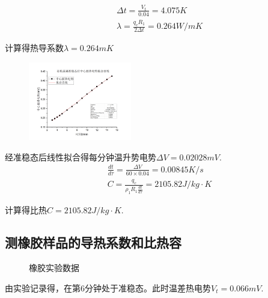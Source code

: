 \documentclass[10pt,a4paper,twocolumn,twoside,UTF8]{ctexart}
\begin{document}
\begin{align*}
	&\varDelta t =\frac{V_t}{0.04}=4.075K\\
    &\lambda=\frac{q_c R_1}{2\varDelta t}=0.264W/mK
\end{align*}

计算得热导系数$\lambda=0.264mK$

\begin{figure}[!h]
	\centering
	\includegraphics[width=0.4\textwidth]{img//6c.png}
	\label{fig:6c}
	\caption{}
\end{figure}
经准稳态后线性拟合得每分钟温升势电势$\varDelta V=0.02028mV$.
\begin{align*}
	&\frac{dt}{d\tau}=\frac{\varDelta V}{60\times 0.04}=0.00845K/s\\
    &C=\frac{q_c}{\rho_1 R_1 \frac{dt}{d\tau}}=2105.82J/kg\cdot K
\end{align*}

计算得比热$C=2105.82J/kg\cdot K$.


\subsection{测橡胶样品的导热系数和比热容}
\begin{figure}[!h]
	\centering
	\caption{橡胶实验数据}
\end{figure}

由实验记录得，在第6分钟处于准稳态。此时温差热电势$V_t=0.066mV$.
\end{document}
